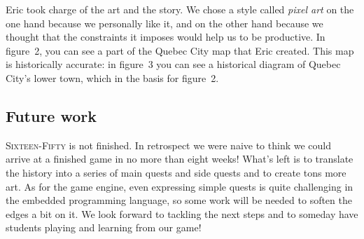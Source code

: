 \documentclass[11pt]{article}
\newcommand{\gametitle}{\textsc{Sixteen-Fifty}}
\begin{document}
Eric took charge of the art and the story.
We chose a style called \emph{pixel art} on the one hand because we personally
like it, and on the other hand because we thought that the constraints it
imposes would help us to be productive. In figure~2, you can see a part of the
Quebec City map that Eric created. This map is historically accurate: in
figure~3 you can see a historical diagram of Quebec City's lower town, which in
the basis for figure~2.

\subsection{Future work}

\gametitle{} is not finished. In retrospect we were naive to think we could
arrive at a finished game in no more than eight weeks! What's left is to
translate the history into a series of main quests and side quests and to create
tons more art. As for the game engine, even expressing simple quests is quite
challenging in the embedded programming language, so some work will be needed to
soften the edges a bit on it. We look forward to tackling the next steps and to
someday have students playing and learning from our game!
\end{document}
